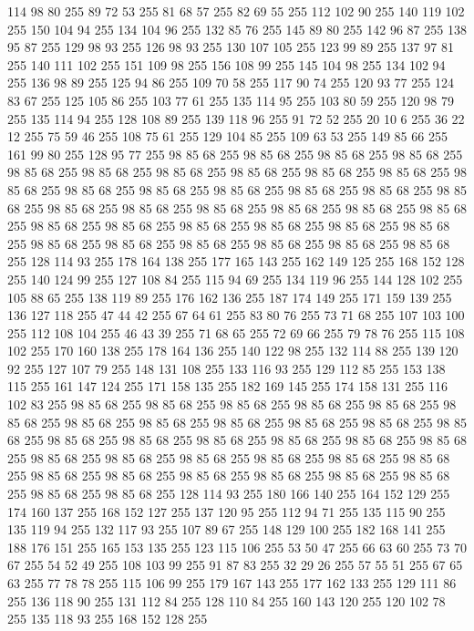 114 98 80 255 89 72 53 255 81 68 57 255 82 69 55 255 112 102 90 255 140 119 102 255 150 104 94 255 134 104 96 255 132 85 76 255 145 89 80 255 142 96 87 255 138 95 87 255 129 98 93 255 126 98 93 255 130 107 105 255 123 99 89 255 137 97 81 255 140 111 102 255 151 109 98 255 156 108 99 255 145 104 98 255 134 102 94 255 136 98 89 255 125 94 86 255 109 70 58 255 117 90 74 255 120 93 77 255 124 83 67 255 125 105 86 255 103 77 61 255 135 114 95 255 103 80 59 255 120 98 79 255 135 114 94 255 128 108 89 255 139 118 96 255 91 72 52 255 20 10 6 255 36 22 12 255 75 59 46 255 108 75 61 255 129 104 85 255 109 63 53 255 149 85 66 255 161 99 80 255 128 95 77 255 98 85 68 255 98 85 68 255 98 85 68 255 98 85 68 255 98 85 68 255 98 85 68 255 98 85 68 255 98 85 68 255 98 85 68 255 98 85 68 255 98 85 68 255 98 85 68 255 98 85 68 255 98 85 68 255 98 85 68 255 98 85 68 255 98 85 68 255 98 85 68 255
98 85 68 255 98 85 68 255 98 85 68 255 98 85 68 255 98 85 68 255 98 85 68 255 98 85 68 255 98 85 68 255 98 85 68 255 98 85 68 255 98 85 68 255 98 85 68 255 98 85 68 255 98 85 68 255 98 85 68 255 98 85 68 255 98 85 68 255 128 114 93 255 178 164 138 255 177 165 143 255 162 149 125 255 168 152 128 255 140 124 99 255 127 108 84 255 115 94 69 255 134 119 96 255 144 128 102 255 105 88 65 255 138 119 89 255 176 162 136 255 187 174 149 255 171 159 139 255 136 127 118 255 47 44 42 255 67 64 61 255 83 80 76 255 73 71 68 255 107 103 100 255 112 108 104 255 46 43 39 255 71 68 65 255 72 69 66 255 79 78 76 255 115 108 102 255 170 160 138 255 178 164 136 255 140 122 98 255 132 114 88 255 139 120 92 255 127 107 79 255 148 131 108 255 133 116 93 255 129 112 85 255 153 138 115 255 161 147 124 255 171 158 135 255 182 169 145 255 174 158 131 255 116 102 83 255 98 85 68 255 98 85 68 255 98 85 68 255 98 85 68 255 98 85 68 255
98 85 68 255 98 85 68 255 98 85 68 255 98 85 68 255 98 85 68 255 98 85 68 255 98 85 68 255 98 85 68 255 98 85 68 255 98 85 68 255 98 85 68 255 98 85 68 255 98 85 68 255 98 85 68 255 98 85 68 255 98 85 68 255 98 85 68 255 98 85 68 255 98 85 68 255 98 85 68 255 98 85 68 255 98 85 68 255 98 85 68 255 98 85 68 255 98 85 68 255 98 85 68 255 98 85 68 255 128 114 93 255 180 166 140 255 164 152 129 255 174 160 137 255 168 152 127 255 137 120 95 255 112 94 71 255 135 115 90 255 135 119 94 255 132 117 93 255 107 89 67 255 148 129 100 255 182 168 141 255 188 176 151 255 165 153 135 255 123 115 106 255 53 50 47 255 66 63 60 255 73 70 67 255 54 52 49 255 108 103 99 255 91 87 83 255 32 29 26 255 57 55 51 255 67 65 63 255 77 78 78 255 115 106 99 255 179 167 143 255 177 162 133 255 129 111 86 255 136 118 90 255 131 112 84 255 128 110 84 255 160 143 120 255 120 102 78 255 135 118 93 255 168 152 128 255
